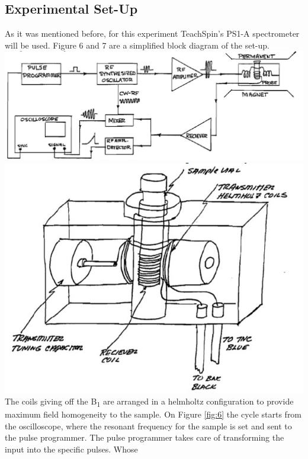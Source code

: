 \documentclass{article}
\begin{document}
{\begin{multicols}{2}
\section{Experimental Set-Up}
As it was mentioned before, for this experiment TeachSpin's PS1-A spectrometer 
will be used. Figure 6 and 7 are a simplified block diagram of the set-up.
\center
\includegraphics[width=\linewidth]{pic-de-manual/circuito.jpg}
\label{fig:6}
\includegraphics[width=\linewidth]{pic-de-manual/cajacentral.jpg}
\label{fig:7}
\justify
The coils giving off the B\textsubscript{1} are arranged in a helmholtz 
configuration to provide maximum field homogeneity to the sample. On Figure 
\ref{fig:6} the cycle starts from the oscilloscope, where the resonant 
frequency for the sample is set and sent to the pulse programmer. The pulse 
programmer takes care of transforming the input into the specific pulses. Whose 

\end{multicols}}
\end{document}
